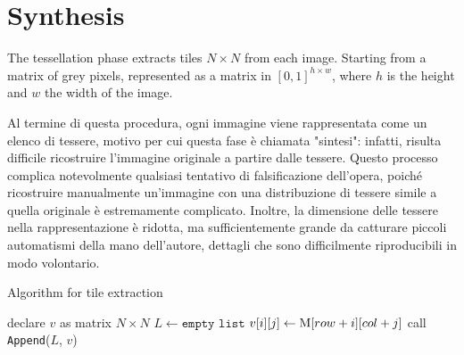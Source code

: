 \section{Synthesis}
The tessellation phase extracts tiles $N\times N$ from each image. Starting from a matrix of grey pixels, represented as a matrix in $\left[0,1\right]^{h \times w}$, where $h$ is the height and $w$ the width of the image.

\noindent Al termine di questa procedura, ogni immagine viene rappresentata come un elenco di tessere, motivo per cui questa fase è chiamata "sintesi": infatti, risulta difficile ricostruire l'immagine originale a partire dalle tessere. Questo processo complica notevolmente qualsiasi tentativo di falsificazione dell'opera, poiché ricostruire manualmente un'immagine con una distribuzione di tessere simile a quella originale è estremamente complicato. Inoltre, la dimensione delle tessere nella rappresentazione è ridotta, ma sufficientemente grande da catturare piccoli automatismi della mano dell'autore, dettagli che sono difficilmente riproducibili in modo volontario.

\begin{algorithm}[ht]
\caption{Algorithm for tile extraction}
\begin{algorithmic}[1]
    \State declare $v$ as matrix $N \times N$ 
    \State $L \gets \texttt{empty list}$ 
            \State $v[i][j] \gets \textnormal{M}[row + i][col + j]$
        \EndFor
        \State call \texttt{Append}($L$, $v$)
    \EndFor
\EndFunction
\label{alg:SequentialTilesExtraction}
\end{algorithmic}
\end{algorithm}

